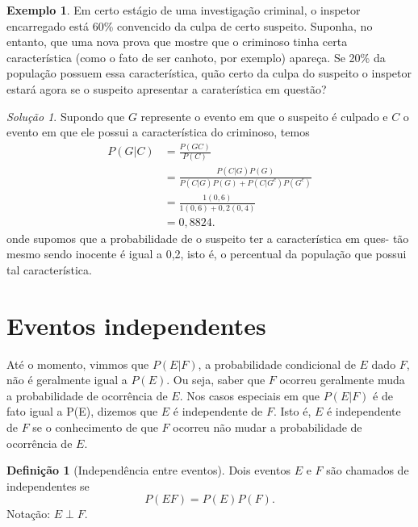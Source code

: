 \documentclass[]{book}
\theoremstyle{definition}
\newtheorem{definition}{Definição}[chapter]
\theoremstyle{definition}
\newtheorem{example}{Exemplo}[chapter]
\theoremstyle{definition}
\theoremstyle{remark}
\newtheorem*{solution}{Solução}
\begin{document}
\begin{example}
\protect\hypertarget{exm:unnamed-chunk-158}{}{\label{exm:unnamed-chunk-158} }Em certo estágio de uma investigação criminal, o inspetor encarregado está 60\% convencido da culpa de certo suspeito.
Suponha, no entanto, que uma nova prova que mostre que o criminoso tinha certa característica (como o fato de ser canhoto, por exemplo) apareça.
Se 20\% da população possuem essa característica, quão certo da culpa do suspeito o inspetor estará agora se o suspeito apresentar a caraterística em questão?
\end{example}

\begin{solution}
\iffalse{} {Solução. } \fi{}Supondo que \(G\) represente o evento em que o suspeito é culpado e
\(C\) o evento em que ele possui a característica do criminoso, temos
\begin{align}
  P(G|C) &= \frac{P(GC)}{P(C)}\\
  &= \frac{P(C|G)P(G)}{P(C|G)P(G)+P(C|G^c)P(G^c)}\\
  &= \frac{1(0,6)}{1(0,6) + 0,2(0,4)}\\
  &= 0,8824.
\end{align}
onde supomos que a probabilidade de o suspeito ter a característica em ques- tão mesmo sendo inocente é igual a 0,2, isto é, o percentual da população que possui tal característica.
\end{solution}

\hypertarget{eventos-independentes}{%
\section{Eventos independentes}\label{eventos-independentes}}

Até o momento, vimmos que \(P(E|F)\), a probabilidade condicional de \(E\) dado \(F\), não é geralmente igual a \(P(E)\).
Ou seja, saber que \(F\) ocorreu geralmente muda a probabilidade de ocorrência de \(E\).
Nos casos especiais em que \(P(E|F)\) é de fato igual a P(E), dizemos que \(E\) é independente de \(F\).
Isto é, \(E\) é independente de \(F\) se o conhecimento de que \(F\) ocorreu não mudar a probabilidade de ocorrência de \(E\).

\begin{definition}[Independência entre eventos]
\protect\hypertarget{def:defIndep}{}{\label{def:defIndep} \iffalse (Independência entre eventos) \fi{} }Dois eventos \(E\) e \(F\) são chamados de independentes se
\[P(EF) = P(E)P(F).\]
Notação: \(E\perp F\).
\end{definition}
\end{document}
